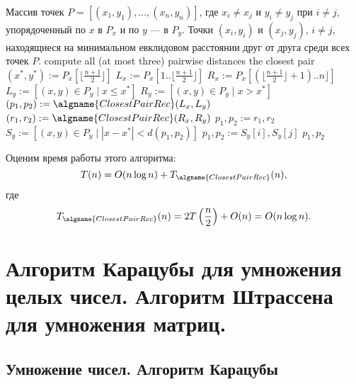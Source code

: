 \documentclass[a4paper,12pt]{article}
\begin{document}
\begin{algorithm}[H]
  	\caption{($P_x, P_y$)}
	\label{algo:pair-rec}
	\begin{algorithmic}
		\Require Массив точек $P = [(x_1, y_1), \dots, (x_n, y_n)]$, где $x_i \neq x_j$ и $y_i \neq y_j$ при $i \neq j$, упорядоченный по $x$ в $P_x$ и по $y$ --- в $P_y$.
		\Ensure Точки $(x_i, y_i)$ и $(x_j, y_j)$, $i \neq j$, находящиеся на минимальном евклидовом расстоянии друг от друга среди всех точек $P$.
		\State
			\State compute all (at most three) pairwise distances
			\Return the closest pair
		\EndIf
		\State
		\State $(x^*, y^*) := P_x[\lfloor\frac{n+1}{2}\rfloor]$
		\State $L_x := P_x[1..\lfloor\frac{n+1}{2}\rfloor]$
		\State $R_x := P_x[(\lfloor\frac{n+1}{2}\rfloor + 1)..n\rfloor]$
		\State $L_y := [(x, y) \in P_y \mid x \leq x^*]$
		\State $R_y := [(x, y) \in P_y \mid x > x^*]$
		\State
		\State $(p_1, p_2) := \algname{ClosestPairRec}(L_x, L_y)$
		\State $(r_1, r_2) := \algname{ClosestPairRec}(R_x, R_y)$
			\State $p_1, p_2 := r_1, r_2$
		\EndIf
		\State
		\State $S_y := [(x, y) \in P_y \mid |x - x^*| < d(p_1, p_2)]$
		\State
 		   			\State $p_1, p_2 := S_y[i], S_y[j]$
				\EndIf
			\EndFor
		\EndFor
		\State
		\Return $p_1, p_2$
	\end{algorithmic}
\end{algorithm}

Оценим время работы этого алгоритма:
$$T(n) = O(n\log n) + T_{\algname{ClosestPairRec}}(n),$$
где
$$T_{\algname{ClosestPairRec}}(n) = 2 T\left(\frac{n}{2}\right) + O(n) = O(n\log n).$$
\newpage
\section{Алгоритм Карацубы для умножения целых чисел. Алгоритм Штрассена для умножения матриц.}

\subsection{Умножение чисел. Алгоритм Карацубы}
\end{document}

